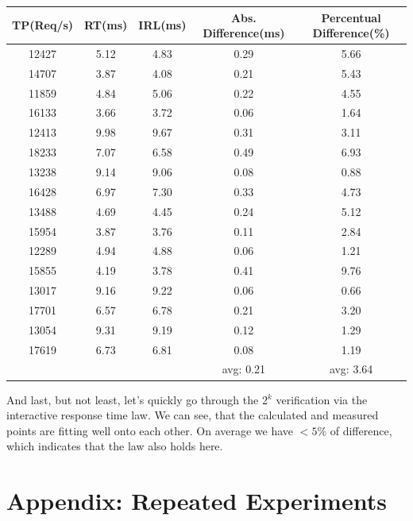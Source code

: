 \documentclass[11pt]{article}
\begin{document}
\begin{tabular}{c|c|c||c|c}
	TP(Req/s) & RT(ms) & IRL(ms) & Abs. Difference(ms) & Percentual Difference(\%) \\
	\hline
	12427 & 5.12 & 4.83 & 0.29 & 5.66 \\
	14707 & 3.87 & 4.08 & 0.21 & 5.43 \\
	11859 & 4.84 & 5.06 & 0.22 & 4.55 \\
	16133 & 3.66 & 3.72 & 0.06 & 1.64 \\
	12413 & 9.98 & 9.67 & 0.31 & 3.11 \\
	18233 & 7.07 & 6.58 & 0.49 & 6.93 \\
	13238 & 9.14 & 9.06 & 0.08 & 0.88 \\
	16428 & 6.97 & 7.30 & 0.33 & 4.73 \\
	13488 & 4.69 & 4.45 & 0.24 & 5.12 \\
	15954 & 3.87 & 3.76 & 0.11 & 2.84 \\
	12289 & 4.94 & 4.88 & 0.06 & 1.21 \\
	15855 & 4.19 & 3.78 & 0.41 & 9.76 \\
	13017 & 9.16 & 9.22 & 0.06 & 0.66 \\
	17701 & 6.57 & 6.78 & 0.21 & 3.20 \\
	13054 & 9.31 & 9.19 & 0.12 & 1.29 \\
	17619 & 6.73 & 6.81 & 0.08 & 1.19 \\
	\hline  
	&&& avg: 0.21 & avg: 3.64 \\
	\hline  
\end{tabular}

\bigskip

And last, but not least, let's quickly go through the 2$^k$ verification via the interactive response time law. We can see, that the calculated and measured points are fitting well onto each other. On average we have $<5\%$ of difference, which indicates that the law also holds here.

\section*{Appendix: Repeated Experiments}\label{sec:appendix}
\end{document}

